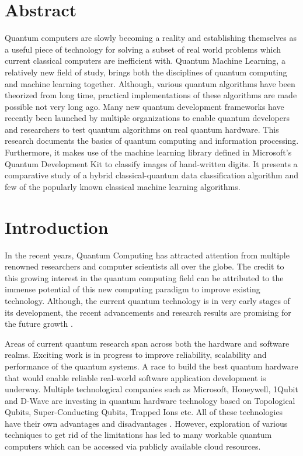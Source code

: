 \documentclass[english,a4paper,11pt,oneside,onecolumn]{book}
\begin{document}
\chapter{Abstract}
Quantum computers are slowly becoming a reality and establishing themselves as a useful piece of technology for solving a subset of real world problems which current classical computers are inefficient with. Quantum Machine Learning, a relatively new field of study, brings both the disciplines of quantum computing and machine learning  together. Although, various quantum algorithms have been theorized from long time, practical implementations of these algorithms are made possible not very long ago. Many new quantum development frameworks have recently been launched by multiple organizations to enable quantum developers and researchers to test quantum algorithms on real quantum hardware. This research documents the basics of quantum computing and information processing. Furthermore, it makes use of the machine learning library defined in Microsoft's Quantum Development Kit to classify images of hand-written digits. It presents a comparative study of a hybrid classical-quantum data classification algorithm and few of the popularly known classical machine learning algorithms.

\tableofcontents

\listoffigures

\listoftables

\mainmatter
{}
%

\chapter{Introduction} 
In the recent years, Quantum Computing has attracted attention from multiple renowned researchers and computer scientists all over the globe. The credit to this growing interest in the quantum computing field can be attributed to the immense potential of this new computing paradigm to improve existing technology. Although, the current quantum technology is in very early stages of its development, the recent advancements and research results are promising for the future growth \cite{castelvecchi_2017_quantum}. 

Areas of current quantum research span across both the hardware and software realms. Exciting work is in progress to improve reliability, scalability and performance of the quantum systems. A race to build the best quantum hardware that would enable reliable real-world software application development is underway. Multiple technological companies such as Microsoft, Honeywell, 1Qubit and D-Wave are investing in quantum hardware technology based on Topological Qubits, Super-Conducting Qubits, Trapped Ions etc. All of these technologies have their own advantages and disadvantages \cite{ladd_2010_quantum}. However, exploration of various techniques to get rid of the limitations has led to many workable quantum computers \cite{castelvecchi_2017_quantum} which can be accessed via publicly available cloud resources.
\end{document}
